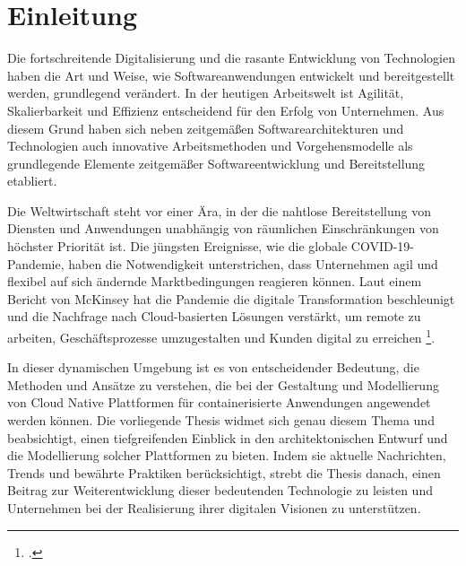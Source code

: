 \newpage
\section{Einleitung}
Die fortschreitende Digitalisierung und die rasante Entwicklung von Technologien haben die Art und Weise, wie Softwareanwendungen entwickelt und bereitgestellt werden, grundlegend verändert. In der heutigen Arbeitswelt ist Agilität, Skalierbarkeit und Effizienz entscheidend für den Erfolg von Unternehmen. Aus diesem Grund haben sich neben zeitgemäßen Softwarearchitekturen und Technologien auch innovative Arbeitsmethoden und Vorgehensmodelle als grundlegende Elemente zeitgemäßer Softwareentwicklung und Bereitstellung etabliert.

Die Weltwirtschaft steht vor einer Ära, in der die nahtlose Bereitstellung von Diensten und Anwendungen unabhängig von räumlichen Einschränkungen von höchster Priorität ist. Die jüngsten Ereignisse, wie die globale COVID-19-Pandemie, haben die Notwendigkeit unterstrichen, dass Unternehmen agil und flexibel auf sich ändernde Marktbedingungen reagieren können. Laut einem Bericht von McKinsey hat die Pandemie die digitale Transformation beschleunigt und die Nachfrage nach Cloud-basierten Lösungen verstärkt, um remote zu arbeiten, Geschäftsprozesse umzugestalten und Kunden digital zu erreichen \footcite[Vgl.][o.S.]{McKinsey2020}.



In dieser dynamischen Umgebung ist es von entscheidender Bedeutung, die Methoden und Ansätze zu verstehen, die bei der Gestaltung und Modellierung von Cloud Native Plattformen für containerisierte Anwendungen angewendet werden können. Die vorliegende Thesis widmet sich genau diesem Thema und beabsichtigt, einen tiefgreifenden Einblick in den architektonischen Entwurf und die Modellierung solcher Plattformen zu bieten. Indem sie aktuelle Nachrichten, Trends und bewährte Praktiken berücksichtigt, strebt die Thesis danach, einen Beitrag zur Weiterentwicklung dieser bedeutenden Technologie zu leisten und Unternehmen bei der Realisierung ihrer digitalen Visionen zu unterstützen.
%




